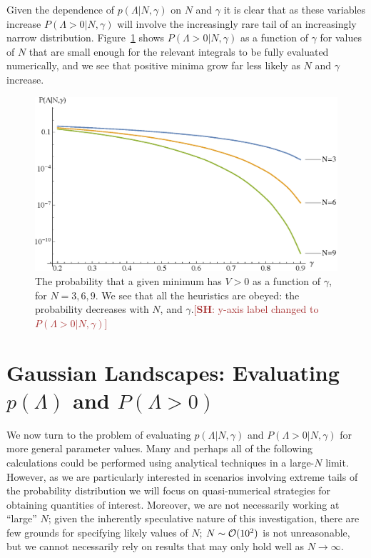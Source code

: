 \documentclass[12pt]{article}
\newcommand{\SH}[1]{\textcolor{brown}{[{\bf SH}: #1]}}
\begin{document}

%
%


Given the dependence of $p(\Lambda|N,\gamma)$ on $N$ and $\gamma$ it is clear that as these variables increase $P(\Lambda>0|N,\gamma)$ will involve the increasingly rare tail of an increasingly narrow distribution. Figure~\ref{N6} shows $P(\Lambda>0|N,\gamma)$ as a function of $\gamma$ for values of $N$ that are small enough for the relevant integrals to be fully evaluated numerically, and we see that positive minima grow far less likely as $N$ and $\gamma$ increase. 



\begin{figure}
  \centering
  \includegraphics[width=.6 \linewidth]{N369.eps}
  \caption{The probability that a given minimum has $V > 0$ as a function of $\gamma$, for $N=3, 6, 9$. We see that all the heuristics are obeyed: the probability decreases with $N$, and  $\gamma$.\SH{y-axis label changed to $P(\Lambda>0|N,\gamma)$}}
  \label{N6}
  \end{figure}


\section{Gaussian Landscapes: Evaluating $p(\Lambda)$ and $P(\Lambda>0)$} \label{PeakNumbers}

We now turn to the problem of evaluating $p(\Lambda|N,\gamma)$ and $P(\Lambda>0|N,\gamma)$  for more general parameter values. Many and perhaps all of the following calculations could be performed using analytical techniques in a large-$N$ limit. However,  as we are particularly interested in scenarios involving extreme tails of  the probability distribution we will focus on quasi-numerical strategies for obtaining quantities of interest. Moreover, we are  not necessarily working at ``large'' $N$; given the inherently speculative nature of this investigation, there are few  grounds for specifying likely values of $N$;  $N\sim{\cal O}(10^2)$ is not unreasonable, but we cannot necessarily rely on results that may only hold well as $N\rightarrow \infty$. 
\end{document}
